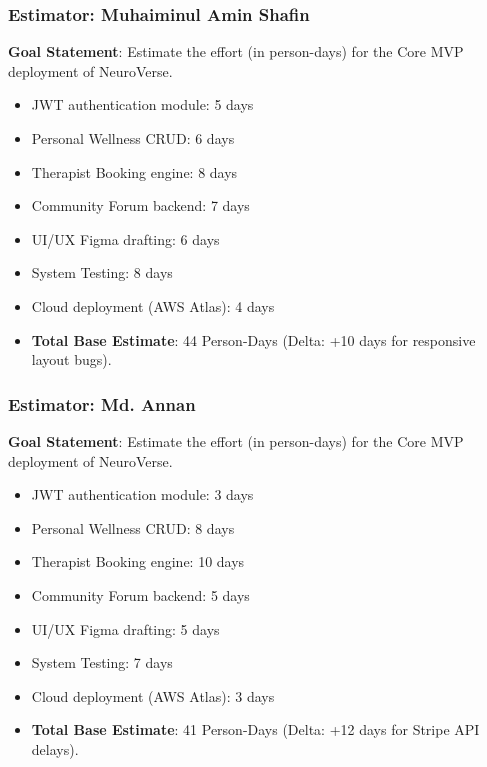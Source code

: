 \documentclass[a4paper,11pt]{report}
\begin{document}
\subsubsection{Estimator: Muhaiminul Amin Shafin}
\textbf{Goal Statement}: Estimate the effort (in person-days) for the Core MVP deployment of NeuroVerse.
\begin{itemize}
    \item JWT authentication module: 5 days
    \item Personal Wellness CRUD: 6 days
    \item Therapist Booking engine: 8 days
    \item Community Forum backend: 7 days
    \item UI/UX Figma drafting: 6 days
    \item System Testing: 8 days
    \item Cloud deployment (AWS Atlas): 4 days
    \item \textbf{Total Base Estimate}: 44 Person-Days (Delta: +10 days for responsive layout bugs).
\end{itemize}

\subsubsection{Estimator: Md. Annan}
\textbf{Goal Statement}: Estimate the effort (in person-days) for the Core MVP deployment of NeuroVerse.
\begin{itemize}
    \item JWT authentication module: 3 days
    \item Personal Wellness CRUD: 8 days
    \item Therapist Booking engine: 10 days
    \item Community Forum backend: 5 days
    \item UI/UX Figma drafting: 5 days
    \item System Testing: 7 days
    \item Cloud deployment (AWS Atlas): 3 days
    \item \textbf{Total Base Estimate}: 41 Person-Days (Delta: +12 days for Stripe API delays).
\end{itemize}
\end{document}
